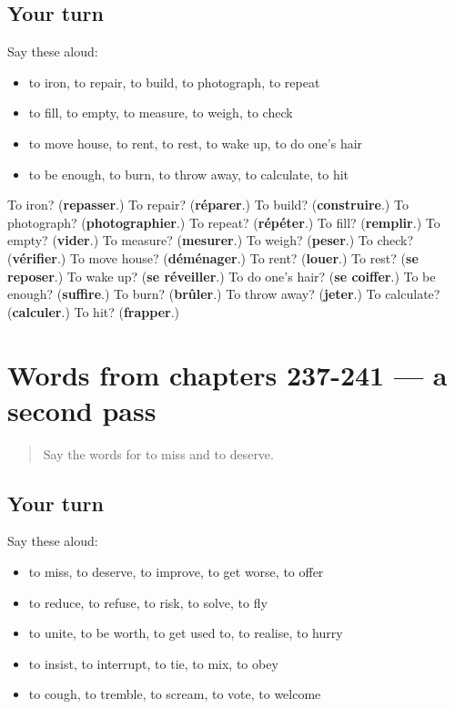 \subsection*{Your turn}
Say these aloud:

\begin{itemize}
\raggedright
  \item to iron, to repair, to build, to photograph, to repeat
  \item to fill, to empty, to measure, to weigh, to check
  \item to move house, to rent, to rest, to wake up, to do one's hair
  \item to be enough, to burn, to throw away, to calculate, to hit
\end{itemize}

\begin{tcolorbox}[breakable,colback=teal!4,colframe=teal!35!black,title={Before you move on}]
To iron? (\textbf{repasser}.) To repair? (\textbf{réparer}.) To build? (\textbf{construire}.) To photograph? (\textbf{photographier}.) To repeat? (\textbf{répéter}.) To fill? (\textbf{remplir}.) To empty? (\textbf{vider}.) To measure? (\textbf{mesurer}.) To weigh? (\textbf{peser}.) To check? (\textbf{vérifier}.) To move house? (\textbf{déménager}.) To rent? (\textbf{louer}.) To rest? (\textbf{se reposer}.) To wake up? (\textbf{se réveiller}.) To do one's hair? (\textbf{se coiffer}.) To be enough? (\textbf{suffire}.) To burn? (\textbf{brûler}.) To throw away? (\textbf{jeter}.) To calculate? (\textbf{calculer}.) To hit? (\textbf{frapper}.)
\end{tcolorbox}
\section[(dialogue)]{Words from chapters 237-241 — a second pass}

\label{lesson:FR-R241-second-pass-words-from-chapters-237-241}



\begin{quote}
Say the words for to miss and to deserve.
\end{quote}

\subsection*{Your turn}
Say these aloud:

\begin{itemize}
\raggedright
  \item to miss, to deserve, to improve, to get worse, to offer
  \item to reduce, to refuse, to risk, to solve, to fly
  \item to unite, to be worth, to get used to, to realise, to hurry
  \item to insist, to interrupt, to tie, to mix, to obey
  \item to cough, to tremble, to scream, to vote, to welcome
\end{itemize}


